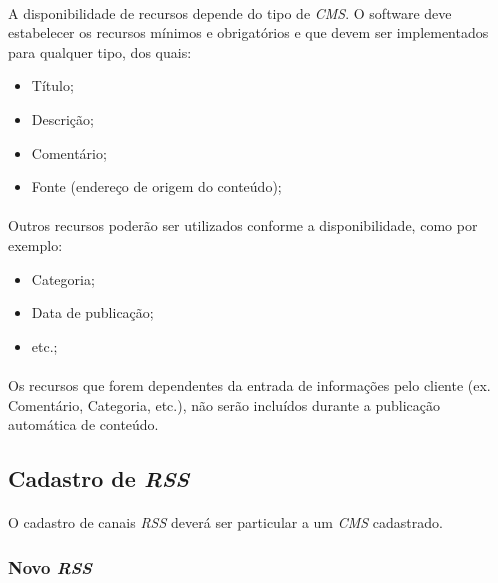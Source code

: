 \documentclass[a4paper,12pt]{article}
\def\cms{\emph{CMS}}
\def\rss{\emph{RSS}}
\begin{document}
\paragraph{}
A disponibilidade de recursos depende do tipo de \cms{}. O software deve
estabelecer os recursos mínimos e obrigatórios e que devem ser implementados
para qualquer tipo, dos quais:

\begin{itemize}
\item Título;
\item Descrição;
\item Comentário;
\item Fonte (endereço de origem do conteúdo);
\end{itemize}

\paragraph{}
Outros recursos poderão ser utilizados conforme a disponibilidade, como por
exemplo:

\begin{itemize}
\item Categoria;
\item Data de publicação;
\item etc.;
\end{itemize}

\paragraph{}
Os recursos que forem dependentes da entrada de informações pelo cliente (ex. Comentário, Categoria, etc.), não serão incluídos durante a publicação automática de conteúdo.


\subsection{Cadastro de \rss{}}

\paragraph{}
O cadastro de canais \rss{} deverá ser particular a um \cms{} cadastrado.


\subsubsection{Novo \rss{}}
\end{document}
